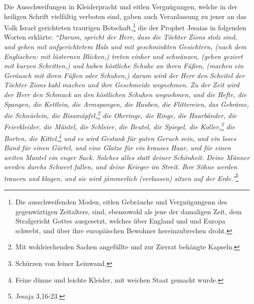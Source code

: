 Die Ausschweifungen in Kleiderpracht und eitlen Vergnügungen, welche in der
heiligen Schrift vielfältig verboten sind, gaben
auch
Veranlassung zu jener an
das Volk Israel gerichteten traurigen
Botschaft,\footnote{
    Die ausschweifenden Moden, eitlen Gebräuche und Vergnügungenn des
gegenwärtigen
    Zeitalters, sind,
    ebensowohl als jene der damaligen Zeit, dem Strafgericht Gottes ausgesetzt,
    welches über England und und Europa schwebt, und über ihre europäischen
    Bewohner hereinzubrechen droht.}
die der Prophet Jesaias in folgenden Worten erklärte:
\textit{
    "`Darum, spricht der Herr, dass die Töchter Zions stolz sind, und gehen mit anfgerichtetem Hals und mit geschminkten
    Gesichtern, (nach dem Englischen: mit lüsternen Blicken,) treten einher und
    schwänzen, (gehen geziert mit kurzen Schritten,) und haben köstliche Schuhe
an
    ihren Füßen, (machen ein Geräusch mit ihren Füßen oder Schuhen,) darum wird
der
    Herr den Scheitel der Töchter Zions kahl machen und ihre Geschmeide
    wegnehmen. Zu der Zeit wird der Herr den Schmuck an den köstlichen Schuhen
    wegnehmen, und die Hefte, die Spangen, die Kettlein, die Armspangen, die
    Hauben, die Flittereien, das Gebräme, die Schnürlein, die
Bisamäpfel,\footnote{
        Mit wohlriechenden Sachen angefüllte und zur Zierrat
        behängte Kapseln.}
    die Ohrringe, die Ringe, die Haarbänder, die Feierkleider,
    die Mäntel, die Schleier, die Beutel, die Spiegel, die
Koller,\footnote{Schürzen von feiner Leinwand.}
    die Borten, die Kittel,\footnote{Feine dünne und leichte
        Kleider, mit weichen Staat gemacht wurde.} und es wird Gestank für guten
        Geruch sein, und ein loses Band für einen Gürtel, und eine Glatze für
ein
        krauses Haar, und für einen weiten Mantel ein enger Sack. Solches alles
	statt deiner Schönheit. Deine Männer werden durchs Schwert fallen, und
deine
	Krieger im Streit. Ihre Söhne werden trauern und klagen, und sie wird
	jämmerlich (verlassen) sitzen auf der Erde."'}\footnote{Jesaja 3,16-23.}

\medskip

